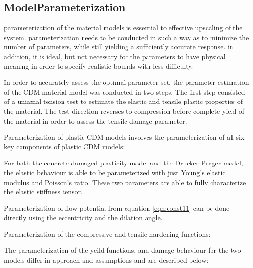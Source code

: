 \subsection{ModelParameterization}
parameterization of the material models is essential to effective upscaling of the system. parameterization needs to be conducted in such a way as to minimize the number of parameters, while still yielding a sufficiently accurate response. in addition, it is ideal, but not necessary for the parameters to have physical meaning in order to specify realistic bounds with less difficulty.

In order to accurately assess the optimal parameter set, the parameter estimation of the CDM material model was conducted in two steps. The first step consisted of a uniaxial tension test to estimate the elastic and tensile plastic properties of the material. The test direction reverses to compression before complete yield of the material in order to assess the tensile damage parameter. 

Parameterization of plastic CDM models involves the parameterization of all six key components of plastic CDM models:

For both the concrete damaged plasticity model and the Drucker-Prager model, the elastic behaviour is able to be parameterized with just Young's elastic modulus and Poisson's ratio. These two parameters are able to fully characterize the elastic stiffness tensor.

Parameterization of flow potential from equation \ref{eqn:const11} can be done directly using the eccentricity and the dilation angle.

Parameterization of the compressive and tensile hardening functions:

The parameterization of the yeild functions, and damage behaviour for the two models differ in approach and assumptions and are described below: